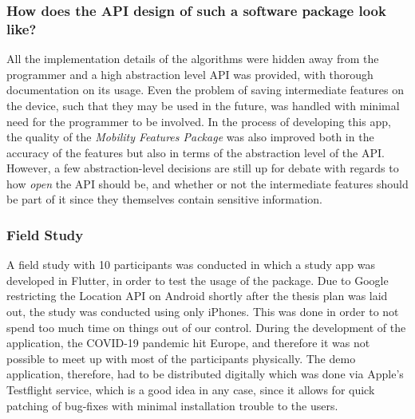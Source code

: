 \subsubsection*{How does the API design of such a software package look like?}
All the implementation details of the algorithms were hidden away from the programmer and a high abstraction level API was provided, with thorough documentation on its usage. Even the problem of saving intermediate features on the device, such that they may be used in the future, was handled with minimal need for the programmer to be involved. In the process of developing this app, the quality of the \textit{Mobility Features Package}  was also improved both in the accuracy of the features but also in terms of the abstraction level of the API. However, a few abstraction-level decisions are still up for debate with regards to how \textit{open} the API should be, and whether or not the intermediate features should be part of it since they themselves contain sensitive information.

\subsubsection*{Field Study}
A field study with 10 participants was conducted in which a study app was developed in Flutter, in order to test the usage of the package. Due to Google restricting the Location API on Android shortly after the thesis plan was laid out, the study was conducted using only iPhones. This was done in order to not spend too much time on things out of our control. During the development of the application, the COVID-19 pandemic hit Europe, and therefore it was not possible to meet up with most of the participants physically. The demo application, therefore, had to be distributed digitally which was done via Apple's Testflight service, which is a good idea in any case, since it allows for quick patching of bug-fixes with minimal installation trouble to the users.